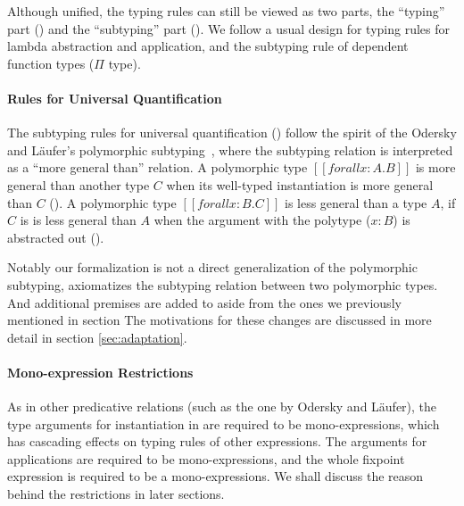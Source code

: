 Although unified, the typing rules can still be viewed as two parts, the ``typing'' part
() and the ``subtyping'' part
(). We follow a usual design for
typing rules for lambda abstraction and application, and the subtyping rule of
dependent function types ($\Pi$ type).

\paragraph{Rules for Universal Quantification}
The subtyping rules for universal quantification () follow
the spirit of the Odersky and L\"aufer's polymorphic subtyping~\cite{odersky1996putting,DunfieldJoshua2013Caeb},
where the subtyping relation is interpreted as a ``more general than'' relation.
A polymorphic type $[[forall x : A. B]]$
is more general than another type $C$ when its well-typed
instantiation is more general than $C$ (). A polymorphic
type $[[forall x : B. C]]$ is less general than a type $A$,
if $C$ is is less general than $A$ when the argument with the polytype ($x:B$)
is abstracted out ().

Notably our formalization is not a direct generalization of the polymorphic subtyping,
 axiomatizes the subtyping relation between two polymorphic types.
And additional premises are added to  aside from the
ones we previously mentioned in section \label{sec:polymorphic-subtyping}
The motivations for these changes are discussed in more detail in section \ref{sec:adaptation}.

\paragraph{Mono-expression Restrictions}
As in other predicative relations (such as the one by Odersky and L\"aufer),
the type arguments for instantiation in  are
required to be mono-expressions, which has cascading effects on typing rules of
other expressions. The arguments for applications are required to be
mono-expressions, and the whole fixpoint expression is required to be a
mono-expressions. We shall
discuss the reason behind the restrictions in later sections.

